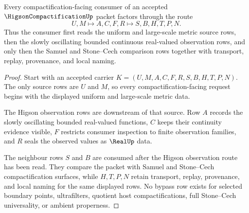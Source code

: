 \begin{theorem}
\label{thm:higson-compactification-uniform-handoff}
Every compactification-facing consumer of an accepted $\HigsonCompactificationUp$ packet factors through the route
$$
U,M \longmapsto A,C,F,R \longmapsto S,B,H,T,P,N .
$$
Thus the consumer first reads the uniform and large-scale metric source rows, then the slowly oscillating bounded continuous real-valued observation rows, and only then the Samuel and Stone--Cech comparison rows together with transport, replay, provenance, and local naming.
\end{theorem}
\begin{proof}
Start with an accepted carrier $K=(U,M,A,C,F,R,S,B,H,T,P,N)$. The only source rows are $U$ and $M$, so every compactification-facing request begins with the displayed uniform and large-scale metric data.

The Higson observation rows are downstream of that source. Row $A$ records the slowly oscillating bounded real-valued functions, $C$ keeps their continuity evidence visible, $F$ restricts consumer inspection to finite observation families, and $R$ seals the observed values as $\RealUp$ data.

The neighbour rows $S$ and $B$ are consumed after the Higson observation route has been read. They compare the packet with Samuel and Stone--Cech compactification surfaces, while $H,T,P,N$ retain transport, replay, provenance, and local naming for the same displayed rows. No bypass row exists for selected boundary points, ultrafilters, quotient host compactifications, full Stone--Cech universality, or ambient properness.
\end{proof}



